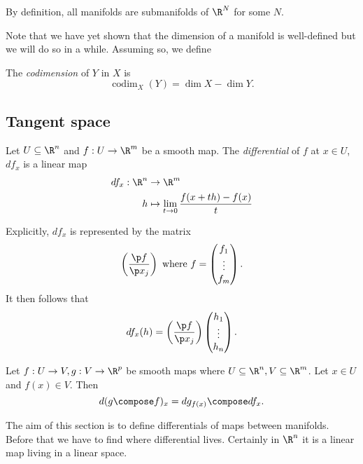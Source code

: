 \documentclass[a4paper]{article}
\DeclareMathOperator{\codim}{codim}
\begin{document}
\begin{remark}
  By definition, all manifolds are submanifolds of \(\R^N\) for some \(N\).
\end{remark}

Note that we have yet shown that the dimension of a manifold is well-defined but we will do so in a while. Assuming so, we define

\begin{definition}[Codimension]
  The \emph{codimension} of \(Y\) in \(X\) is
  \[
    \codim_X(Y) = \dim X - \dim Y.
  \]
\end{definition}

\subsection{Tangent space}

\begin{definition}[Differential]
  Let \(U \subseteq \R^n\) and \(f: U \to \R^m\) be a smooth map. The \emph{differential} of \(f\) at \(x \in U\), \(df_x\) is a linear map
  \begin{align*}
    df_x: \R^n &\to \R^m \\
    h &\mapsto \lim_{t \to 0} \frac{f(x + th) - f(x)}{t}
  \end{align*}
\end{definition}

Explicitly, \(df_x\) is represented by the matrix
\[
  \left( \frac{\p f}{\p x_j} \right) \text{ where } f =
  \begin{pmatrix}
    f_1 \\
    \vdots \\
    f_m
  \end{pmatrix}
  .
\]
It then follows that
\[
  df_x(h) = \left(\frac{\p f}{\p x_j}\right)
  \begin{pmatrix}
    h_1 \\
    \vdots \\
    h_n
  \end{pmatrix}
  .
\]

\begin{proposition}
  Let \(f: U \to V, g: V \to \R^p\) be smooth maps where \(U \subseteq \R^n, V \subseteq \R^m\). Let \(x \in U\) and \(f(x) \in V\). Then
  \[
    d(g \compose f)_x = dg_{f(x)} \compose df_x.
  \]
\end{proposition}

The aim of this section is to define differentials of maps between manifolds. Before that we have to find where differential lives. Certainly in \(\R^n\) it is a linear map living in a linear space.
\end{document}
